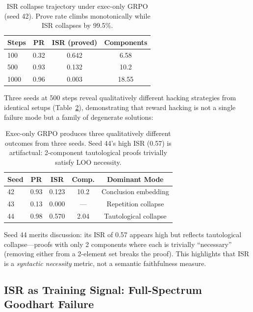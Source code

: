 \documentclass[11pt,a4paper]{article}
\begin{document}
\begin{table}[t]
\centering
\small
\begin{tabular}{lccc}
\toprule
\textbf{Steps} & \textbf{PR} & \textbf{ISR (proved)} & \textbf{Components} \\
\midrule
100 & 0.32 & 0.642 & 6.58 \\
500 & 0.93 & 0.132 & 10.2 \\
1000 & 0.96 & 0.003 & 18.55 \\
\bottomrule
\end{tabular}
\caption{ISR collapse trajectory under exec-only GRPO (seed 42). Prove rate climbs monotonically while ISR collapses by 99.5\%.}
\label{tab:collapse}
\end{table}

Three seeds at 500 steps reveal qualitatively different hacking strategies from identical setups (Table~\ref{tab:exec_seeds}), demonstrating that reward hacking is not a single failure mode but a family of degenerate solutions:

\begin{table}[t]
\centering
\small
\begin{tabular}{lcccc}
\toprule
\textbf{Seed} & \textbf{PR} & \textbf{ISR} & \textbf{Comp.} & \textbf{Dominant Mode} \\
\midrule
42 & 0.93 & 0.123 & 10.2 & Conclusion embedding \\
43 & 0.13 & 0.000 & --- & Repetition collapse \\
44 & 0.98 & 0.570 & 2.04 & Tautological collapse \\
\bottomrule
\end{tabular}
\caption{Exec-only GRPO produces three qualitatively different outcomes from three seeds. Seed 44's high ISR (0.57) is artifactual: 2-component tautological proofs trivially satisfy LOO necessity.}
\label{tab:exec_seeds}
\end{table}

Seed 44 merits discussion: its ISR of 0.57 appears high but reflects tautological collapse---proofs with only 2 components where each is trivially ``necessary'' (removing either from a 2-element set breaks the proof).
This highlights that ISR is a \emph{syntactic necessity} metric, not a semantic faithfulness measure.

\subsection{ISR as Training Signal: Full-Spectrum Goodhart Failure}
\label{sec:goodhart}
\end{document}
